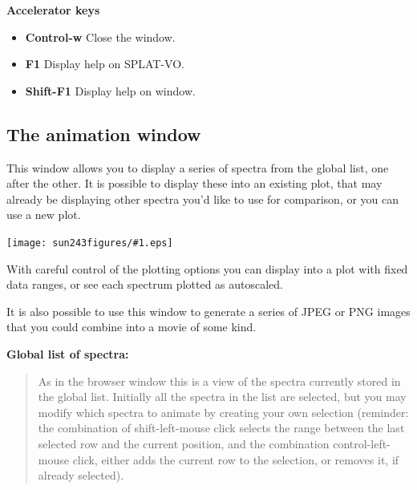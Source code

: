 \documentclass[twoside,11pt]{article}
\newcommand{\htmladdimg}[1]{}
\newcommand{\latexhtml}[2]{#1}
\newcommand{\xlabel}[1]{}
\renewcommand{\_}{\texttt{\symbol{95}}}
\newcommand{\SPLAT}{\textsf{SPLAT-VO}}
\newcommand{\mainfigure}[1]
{\begin{center}
 \latexhtml{\texttt{[image: sun243\_figures/\#1.eps]}}{\htmladdimg{#1.gif}}
 \end{center}
}
\newcommand{\labelitem}[1]{\textbf{#1}}
\newcommand{\subheading}[1]{\textbf{\large{#1}}}
\begin{document}
\subheading{Accelerator keys}

\begin{itemize}
\item \labelitem{Control-w} Close the window.
\item \labelitem{F1} Display help on \SPLAT.     
\item \labelitem{Shift-F1} Display help on window.
\end{itemize}


\newpage
\subsection{The animation window\xlabel{animation_window}}

This window allows you to display a series of spectra from the global list,
one after the other. It is possible to display these into an existing plot,
that may already be displaying other spectra you'd like to use for comparison,
or you can use a new plot.

\mainfigure{animationwindow}

With careful control of the plotting options you can display into a
plot with fixed data ranges, or see each spectrum plotted as
autoscaled.

It is also possible to use this window to generate a series of JPEG or PNG
images that you could combine into a movie of some kind.

\subheading{Global list of spectra:}
\begin{quote}
 As in the browser window this is a view of the spectra currently
 stored in the global list. Initially all the spectra in the list are
 selected, but you may modify which spectra to animate by creating your
 own selection (reminder: the combination of shift-left-mouse click
 selects the range between the last selected row and the current
 position, and the combination control-left-mouse click, either adds
 the current row to the selection, or removes it, if already selected).
\end{quote}
\end{document}
